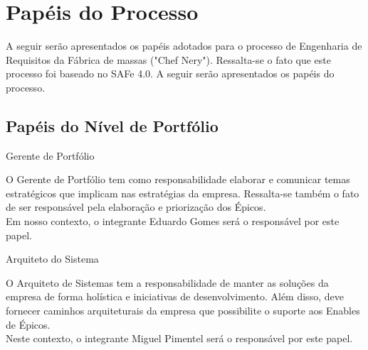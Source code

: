 {
	\large{\section {Papéis do Processo\\} }

	\tab A seguir serão apresentados os papéis adotados para o processo de Engenharia de Requisitos da Fábrica de massas ("Chef Nery"). Ressalta-se o fato que este processo foi baseado no SAFe 4.0. A seguir serão apresentados os papéis do processo.\\

}


{\large{\subsection {Papéis do Nível de Portfólio\\} } }

\begin{itemize}


{
	\large{\item {Gerente de Portfólio\\} }

	\tab O Gerente de Portfólio tem como responsabilidade elaborar e comunicar temas estratégicos que implicam nas estratégias da empresa. Ressalta-se também o fato de ser responsável pela elaboração e priorização dos Épicos. \\
	\tab Em nosso contexto, o integrante Eduardo Gomes será o responsável por este papel. \\
}


{
	\large{\item {Arquiteto do Sistema\\} }

	\tab O Arquiteto de Sistemas tem a responsabilidade de manter as soluções da empresa de forma holística e iniciativas de desenvolvimento. Além disso, deve fornecer caminhos arquiteturais da empresa que possibilite o suporte aos Enables de Épicos. \\
	\tab Neste contexto, o integrante Miguel Pimentel será o responsável por este papel. \\
}

\end{itemize}

